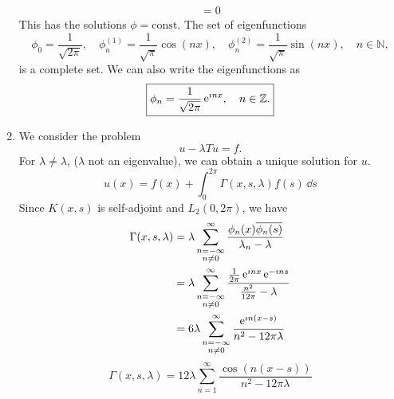 \begin{Solution}
\begin{enumerate}
\begin{gather*}
      = 0
    \end{gather*}
    This has the solutions $\phi = \mathrm{const}$.  The set of eigenfunctions
    \[
    \boxed{
      \phi_0 = \frac{1}{\sqrt{2\pi}},
      \quad \phi_n^{(1)} = \frac{1}{\sqrt{\pi}} \cos(n x), 
      \quad \phi_n^{(2)} = \frac{1}{\sqrt{\pi}} \sin(n x), 
      \quad n \in \mathbb{N},
      }
    \]
    is a complete set.
    We can also write the eigenfunctions as
    \[
    \boxed{
      \phi_n = \frac{1}{\sqrt{2 \pi}} \mathop{\mathrm{e}}\nolimits^{\imath n x}, \quad n \in \mathbb{Z}.
      }
    \]
  \item
    We consider the problem 
    \[
    u - \lambda T u = f.
    \]
    For $\lambda \neq \lambda$, ($\lambda$ not an eigenvalue), we can obtain
    a unique solution for $u$.  
    \[
    u(x) = f(x) + \int_0^{2\pi} \Gamma(x,s,\lambda) f(s) \,\dd s
    \]
    Since $K(x,s)$ is self-adjoint and $L_2(0,2\pi)$, we have
    \begin{align*}
      \Gamma(x,s,\lambda)
      &= \lambda \sum_{\substack{n = -\infty \\ n \neq 0}}^\infty
      \frac{ \phi_n(x) \overline{\phi_n(s)} }{ \lambda_n - \lambda } \\
      &= \lambda \sum_{\substack{n = -\infty \\ n \neq 0}}^\infty
      \frac{ \frac{1}{2\pi} \mathop{\mathrm{e}}\nolimits^{\imath n x} \mathop{\mathrm{e}}\nolimits^{-\imath n s} }
      { \frac{n^2}{12 \pi} - \lambda } \\
      &= 6 \lambda \sum_{\substack{n = -\infty \\ n \neq 0}}^\infty
      \frac{ \mathop{\mathrm{e}}\nolimits^{\imath n (x-s)} }{ n^2 - 12 \pi \lambda } 
    \end{align*}
    \[
    \boxed{
      \Gamma(x,s,\lambda)
      = 12 \lambda \sum_{n = 1}^\infty \frac{ \cos(n(x-s)) }{ n^2 - 12 \pi \lambda }
      }
    \]
  \end{enumerate}
\end{Solution}



